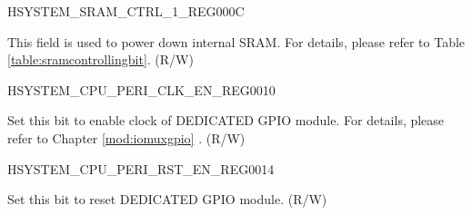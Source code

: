 \begin{register}{H}{SYSTEM\_SRAM\_CTRL\_1\_REG}{\hexprefix{}000C}\label{regdesc:SYSTEMSRAMCTRL1REG}
%
%
\regnewline%
\begin{regdesc}\begin{reglist}
\label{fielddesc:SYSTEMSRAMFORCEPD}\item [SYSTEM\_SRAM\_FORCE\_PD] This field is used to power down internal SRAM. For details, please refer to Table \ref{table:sramcontrollingbit}. (R/W)

\end{reglist}\end{regdesc}
\end{register}



\begin{register}{H}{SYSTEM\_CPU\_PERI\_CLK\_EN\_REG}{\hexprefix{}0010}\label{regdesc:SYSTEMCPUPERICLKENREG}
%
%
%
%
\regnewline%
\begin{regdesc}\begin{reglist}
\label{fielddesc:SYSTEMCLKENDEDICATEDGPIO}\item [SYSTEM\_CLK\_EN\_DEDICATED\_GPIO] Set this bit to enable clock of DEDICATED GPIO module. For details, please refer to Chapter \ref{mod:iomuxgpio} \textit{}. (R/W)
\end{reglist}\end{regdesc}
\end{register}


\begin{register}{H}{SYSTEM\_CPU\_PERI\_RST\_EN\_REG}{\hexprefix{}0014}\label{regdesc:SYSTEMCPUPERIRSTENREG}
%
%
%
%
\regnewline%
\begin{regdesc}\begin{reglist}
\label{fielddesc:SYSTEMRSTENDEDICATEDGPIO}\item [SYSTEM\_RST\_EN\_DEDICATED\_GPIO] Set this bit to reset DEDICATED GPIO module. (R/W)
\end{reglist}\end{regdesc}
\end{register}


